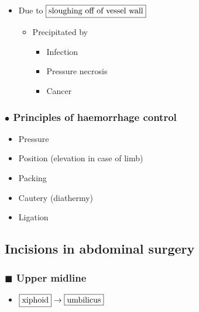 \documentclass[
  14pt,
]{extarticle}
\providecommand{\tightlist}{%
  \setlength{\itemsep}{0pt}\setlength{\parskip}{0pt}}
\begin{document}
\begin{itemize}
\tightlist
\item
  Due to \(\fbox{sloughing off of vessel wall}\)

  \begin{itemize}
  \tightlist
  \item
    Precipitated by

    \begin{itemize}
    \tightlist
    \item
      Infection
    \item
      Pressure necrosis
    \item
      Cancer
    \end{itemize}
  \end{itemize}
\end{itemize}

\hypertarget{bullet-principles-of-haemorrhage-control}{%
\subsubsection{\texorpdfstring{\(\bullet\) Principles of haemorrhage
control}{\textbackslash bullet Principles of haemorrhage control}}\label{bullet-principles-of-haemorrhage-control}}

\begin{itemize}
\tightlist
\item
  Pressure
\item
  Position (elevation in case of limb)
\item
  Packing
\item
  Cautery (diathermy)
\item
  Ligation
\end{itemize}

\hypertarget{incisions-in-abdominal-surgery}{%
\subsection{Incisions in abdominal
surgery}\label{incisions-in-abdominal-surgery}}

\hypertarget{blacksquare-upper-midline}{%
\subsubsection{\texorpdfstring{\(\blacksquare\) Upper
midline}{\textbackslash blacksquare Upper midline}}\label{blacksquare-upper-midline}}

\begin{itemize}
\tightlist
\item
  \(\fbox{xiphoid}\rightarrow\fbox{umbilicus}\)
\end{itemize}
\end{document}
